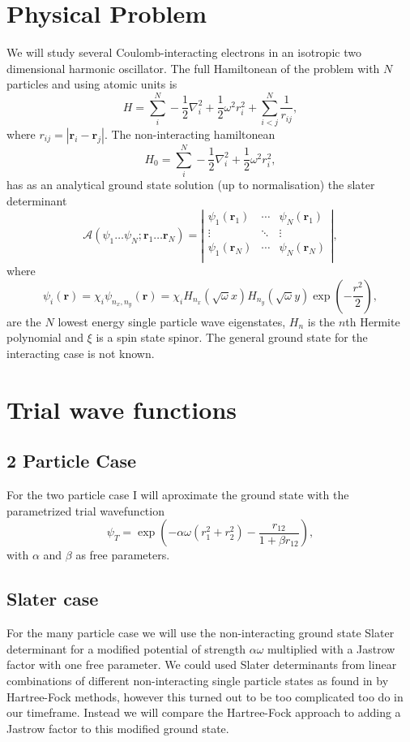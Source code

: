 \documentclass[a4paper,English,10pt]{article}
\newcommand{\bb}[1]{\boldsymbol{#1}}
\newcommand{\be}{\begin{equation}}
\newcommand{\ee}{\end{equation}}
\newcommand{\f}{\frac}
\begin{document}
\section{Physical Problem}
We will study several Coulomb-interacting electrons in an isotropic two dimensional harmonic oscillator.
The full Hamiltonean of the problem with $N$ particles and using atomic units is
\be
H = \sum_i^N -\f{1}{2}\nabla^2_i + \f{1}{2}\omega^2r^2_i + \sum_{i<j}^N\f{1}{r_{ij}}, \label{ham}
\ee
where $r_{ij} = |\bb{r}_i-\bb{r}_j|$.
The non-interacting hamiltonean
\be
H_0 = \sum_i^N -\f{1}{2}\nabla^2_i + \f{1}{2}\omega^2r^2_i,\label{ham0}
\ee
has as an analytical ground state solution (up to normalisation) the slater determinant
\be
\mathcal{A}\left(\psi_1\ldots\psi_N;\bb{r}_1\ldots\bb{r}_N\right) =
\left|\begin{matrix}
  \psi_1(\bb{r}_1)&\cdots&\psi_N(\bb{r}_1)\\
  \vdots&\ddots&\vdots\\
  \psi_1(\bb{r}_N)&\cdots&\psi_N(\bb{r}_N)\\
  \end{matrix}\right|,
\ee
where
\be
\psi_i(\bb{r}) = \chi_i\psi_{n_x,n_y}(\bb{r}) = \chi_iH_{n_x}(\sqrt{\omega}x)H_{n_y}(\sqrt{\omega}y)\exp(-\f{r^2}{2}),\label{spwf}
\ee
are the $N$ lowest energy single particle wave eigenstates, $H_n$ is the $n$th Hermite polynomial and $\xi$ is a spin state spinor.
The general ground state for the interacting case is not known.


\section{Trial wave functions}
\subsection{2 Particle Case}
For the two particle case I will aproximate the ground state with the parametrized trial wavefunction
\be
\psi_T = \exp\left(-\alpha\omega(r_1^2 + r_2^2) -\f{r_{12}}{1+\beta r_{12}}\right),\label{2pw}
\ee
with $\alpha$ and $\beta$ as free parameters.

\subsection{Slater case}

For the many particle case we will use the non-interacting ground state Slater determinant for a modified potential of strength $\alpha\omega$
multiplied with a Jastrow factor with one free parameter.
We could used Slater determinants from linear combinations of different non-interacting single particle states as found in \cite{proj1} by Hartree-Fock methods,
however this turned out to be too complicated too do in our timeframe. Instead we will compare the Hartree-Fock approach to adding a Jastrow factor to this modified ground state.
\end{document}

